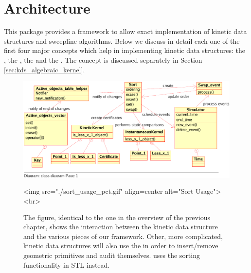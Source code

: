 
\section{Architecture\label{sec:kds_architecture}}


This package provides a framework to allow exact implementation of
kinetic data structures and sweepline algorithms. Below we discuss in
detail each one of the first four major concepts which help in
implementing kinetic data structures: the ,
the , the  and the
.  The 
concept is discussed separately in Section
\ref{sec:kds_algebraic_kernel}.

\begin{figure}
\begin{ccTexOnly}
\begin{center}
\includegraphics[scale=.8,viewport=0 18 470 250, clip]{Kinetic_data_structures/sort_usage_pct}
\end{center}
\end{ccTexOnly}
\begin{ccHtmlOnly}
<img src="./sort_usage_pct.gif" align=center alt="Sort Usage"><br>
\end{ccHtmlOnly}
\caption{\label{fig:kds_uml_usage_architecture} The figure, identical
  to the one in the overview of the previous chapter, shows the
  interaction between the  kinetic
  data structure and the various pieces of our framework.  Other, more
  complicated, kinetic data structures will also use the
   in order to insert/remove
  geometric primitives and audit themselves.
   uses the sorting functionality
  in STL instead.}
\end{figure}


